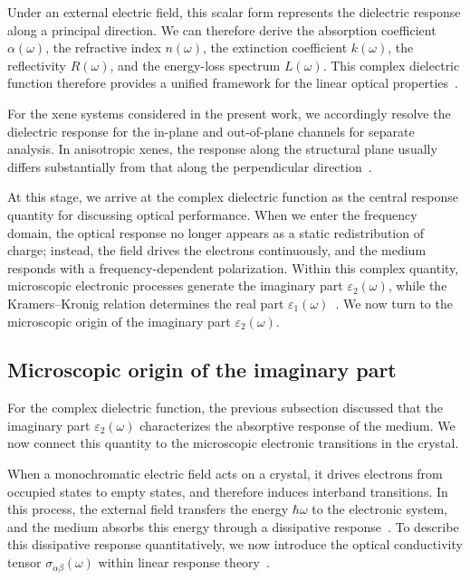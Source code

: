 Under an external electric field, this scalar form represents the dielectric response along a principal direction.
We can therefore derive the absorption coefficient $\alpha(\omega)$,
the refractive index $n(\omega)$,
the extinction coefficient $k(\omega)$,
the reflectivity $R(\omega)$,
and the energy-loss spectrum $L(\omega)$.
This complex dielectric function therefore provides a unified framework for the linear optical properties~\cite{onida2002electronic,djurivsic2002progress,niu2024electronic}.

For the xene systems considered in the present work,
we accordingly resolve the dielectric response for the in-plane and out-of-plane channels for separate analysis.
In anisotropic xenes, the response along the structural plane usually differs substantially from that along the perpendicular direction~\cite{marinopoulos2002anisotropy,huang2023optical,slavich2024exploring,cheng2025two}.

At this stage, we arrive at the complex dielectric function as the central response quantity for discussing optical performance.
When we enter the frequency domain, the optical response no longer appears as a static redistribution of charge;
instead, the field drives the electrons continuously, and the medium responds with a frequency-dependent polarization.
Within this complex quantity, microscopic electronic processes generate the imaginary part $\varepsilon_2(\omega)$,
while the Kramers--Kronig relation determines the real part $\varepsilon_1(\omega)$~\cite{de1926theory, toll1956causality, persson2001first}.
We now turn to the microscopic origin of the imaginary part $\varepsilon_2(\omega)$.

\subsection{Microscopic origin of the imaginary part}

For the complex dielectric function,
the previous subsection discussed that the imaginary part $\varepsilon_2(\omega)$ characterizes the absorptive response of the medium.
We now connect this quantity to the microscopic electronic transitions in the crystal.

When a monochromatic electric field acts on a crystal,
it drives electrons from occupied states to empty states,
and therefore induces interband transitions.
In this process, the external field transfers the energy $\hbar\omega$ to the electronic system,
and the medium absorbs this energy through a dissipative response~\cite{toudert2017interband}.
To describe this dissipative response quantitatively,
we now introduce the optical conductivity tensor $\sigma_{\alpha\beta}(\omega)$ within linear response theory~\cite{kubo1957statistical}.

